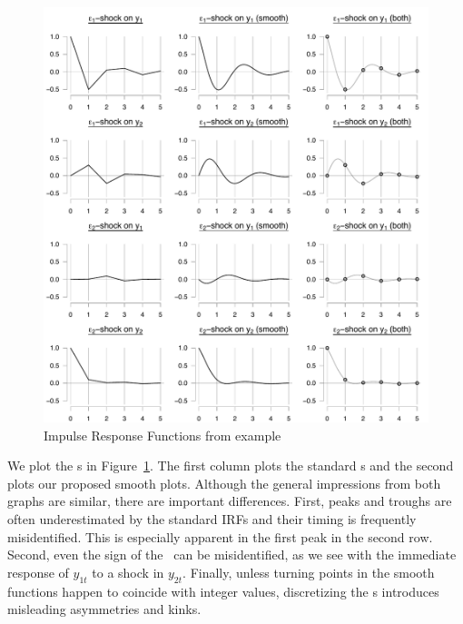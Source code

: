 \documentclass[12pt,fleqn]{article}
\begin{document}
\begin{figure}[t]
  \centering
  \includegraphics{graphs/numeric.pdf}
  \caption{Impulse Response Functions from example}
  \label{f1}
\end{figure}

We plot the \IRF s in Figure~\ref{f1}. The first column plots the
standard \IRF s and the second plots our proposed smooth
plots. Although the general impressions from both graphs are similar,
there are important differences. First, peaks and troughs are often
underestimated by the standard IRFs and their timing is frequently
misidentified. This is especially apparent in the first peak in the
second row. Second, even the sign of the \IRF\ can be misidentified,
as we see with the immediate response of $y_{1t}$ to a shock in
$y_{2t}$. Finally, unless turning points in the smooth functions
happen to coincide with integer values, discretizing the \IRF s
introduces misleading asymmetries and kinks.
\end{document}
